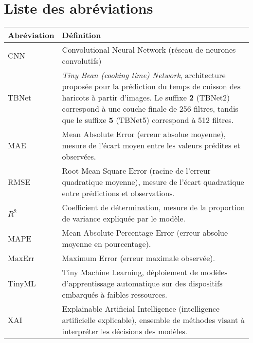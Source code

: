 \chapter*{Liste des abréviations}

\begin{longtable}{|p{3cm}|p{11cm}|}
\hline
\textbf{Abréviation} & \textbf{Définition} \\
\hline
CNN & Convolutional Neural Network (réseau de neurones convolutifs) \\
\hline
TBNet & \textit{Tiny Bean (cooking time) Network}, architecture proposée pour la prédiction du temps de cuisson des haricots à partir d’images. 
Le suffixe \textbf{2} (TBNet2) correspond à une couche finale de 256 filtres, tandis que le suffixe \textbf{5} (TBNet5) correspond à 512 filtres. \\
\hline
MAE & Mean Absolute Error (erreur absolue moyenne), mesure de l’écart moyen entre les valeurs prédites et observées. \\
\hline
RMSE & Root Mean Square Error (racine de l’erreur quadratique moyenne), mesure de l’écart quadratique entre prédictions et observations. \\
\hline
$R^2$ & Coefficient de détermination, mesure de la proportion de variance expliquée par le modèle. \\
\hline
MAPE & Mean Absolute Percentage Error (erreur absolue moyenne en pourcentage). \\
\hline
MaxErr & Maximum Error (erreur maximale observée). \\
\hline
TinyML & Tiny Machine Learning, déploiement de modèles d’apprentissage automatique sur des dispositifs embarqués à faibles ressources. \\
\hline
XAI & Explainable Artificial Intelligence (intelligence artificielle explicable), ensemble de méthodes visant à interpréter les décisions des modèles. \\
\hline
\end{longtable}
